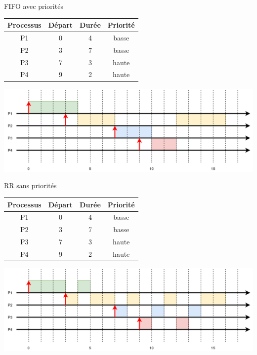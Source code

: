 \documentclass[10pt]{nsibeamer}
\begin{document}
\begin{frame}{FIFO avec priorités}
\scriptsize
\begin{center}
\begin{tabular}{|c|c|c|c|}
\hline\rowcolor{UGLiRed}
\textbf{\color{white} Processus} & \textbf{\color{white}Départ} & \textbf{\color{white}Durée} & \textbf{\color{white}Priorité} \\
\hline
P1 & 0 & 4 & basse \\
\hline
P2 & 3 & 7 & basse \\
\hline
P3 & 7 & 3 & haute \\
\hline
P4 & 9 & 2 & haute \\
\hline
\end{tabular}
\end{center}
\includegraphics[width=\linewidth]{img/FIFOP}
\end{frame}
\begin{frame}{RR sans priorités}
\scriptsize
\begin{center}
\begin{tabular}{|c|c|c|c|}
\hline\rowcolor{UGLiRed}
\textbf{\color{white} Processus} & \textbf{\color{white}Départ} & \textbf{\color{white}Durée} & \textbf{\color{white}Priorité} \\
\hline
P1 & 0 & 4 & basse \\
\hline
P2 & 3 & 7 & basse \\
\hline
P3 & 7 & 3 & haute \\
\hline
P4 & 9 & 2 & haute \\
\hline
\end{tabular}
\end{center}
\includegraphics[width=\linewidth]{img/RR}
\end{frame}
\end{document}
